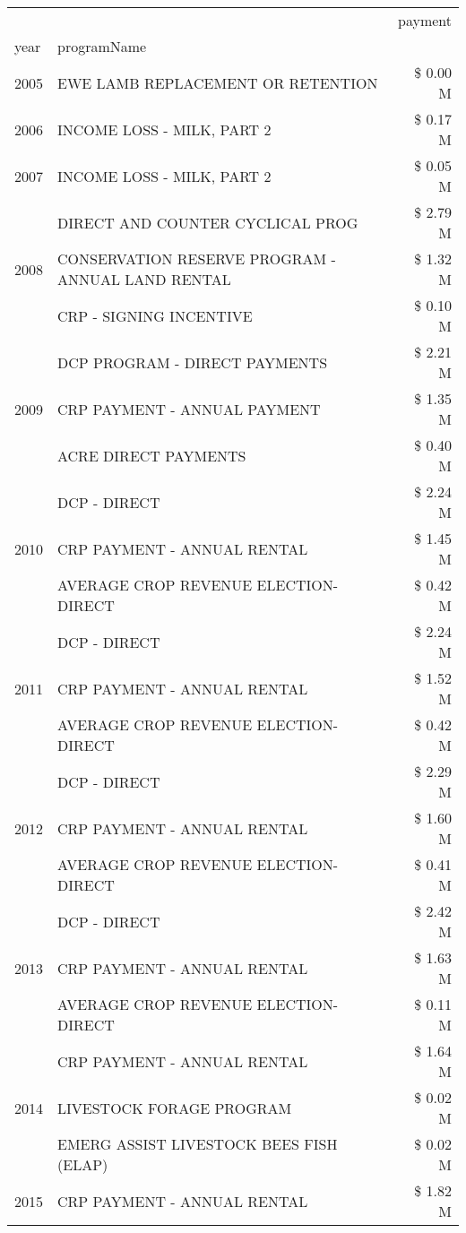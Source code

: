 \begin{tabular}{llr}
\toprule
 &  & payment \\
year & programName &  \\
\midrule
2005 & EWE LAMB REPLACEMENT OR RETENTION & \$ 0.00 M \\
\cline{1-3}
2006 & INCOME LOSS - MILK, PART 2 & \$ 0.17 M \\
\cline{1-3}
2007 & INCOME LOSS - MILK, PART 2 & \$ 0.05 M \\
\cline{1-3}
\multirow[t]{3}{*}{2008} & DIRECT AND COUNTER CYCLICAL PROG & \$ 2.79 M \\
 & CONSERVATION RESERVE PROGRAM - ANNUAL LAND RENTAL & \$ 1.32 M \\
 & CRP - SIGNING INCENTIVE & \$ 0.10 M \\
\cline{1-3}
\multirow[t]{3}{*}{2009} & DCP PROGRAM - DIRECT PAYMENTS & \$ 2.21 M \\
 & CRP PAYMENT - ANNUAL PAYMENT & \$ 1.35 M \\
 & ACRE DIRECT PAYMENTS & \$ 0.40 M \\
\cline{1-3}
\multirow[t]{3}{*}{2010} & DCP - DIRECT & \$ 2.24 M \\
 & CRP PAYMENT - ANNUAL RENTAL & \$ 1.45 M \\
 & AVERAGE CROP REVENUE ELECTION-DIRECT & \$ 0.42 M \\
\cline{1-3}
\multirow[t]{3}{*}{2011} & DCP - DIRECT & \$ 2.24 M \\
 & CRP PAYMENT - ANNUAL RENTAL & \$ 1.52 M \\
 & AVERAGE CROP REVENUE ELECTION-DIRECT & \$ 0.42 M \\
\cline{1-3}
\multirow[t]{3}{*}{2012} & DCP - DIRECT & \$ 2.29 M \\
 & CRP PAYMENT - ANNUAL RENTAL & \$ 1.60 M \\
 & AVERAGE CROP REVENUE ELECTION-DIRECT & \$ 0.41 M \\
\cline{1-3}
\multirow[t]{3}{*}{2013} & DCP - DIRECT & \$ 2.42 M \\
 & CRP PAYMENT - ANNUAL RENTAL & \$ 1.63 M \\
 & AVERAGE CROP REVENUE ELECTION-DIRECT & \$ 0.11 M \\
\cline{1-3}
\multirow[t]{3}{*}{2014} & CRP PAYMENT - ANNUAL RENTAL & \$ 1.64 M \\
 & LIVESTOCK FORAGE PROGRAM & \$ 0.02 M \\
 & EMERG ASSIST LIVESTOCK BEES FISH (ELAP) & \$ 0.02 M \\
\cline{1-3}
\multirow[t]{3}{*}{2015} & CRP PAYMENT - ANNUAL RENTAL & \$ 1.82 M \\

\end{tabular}

